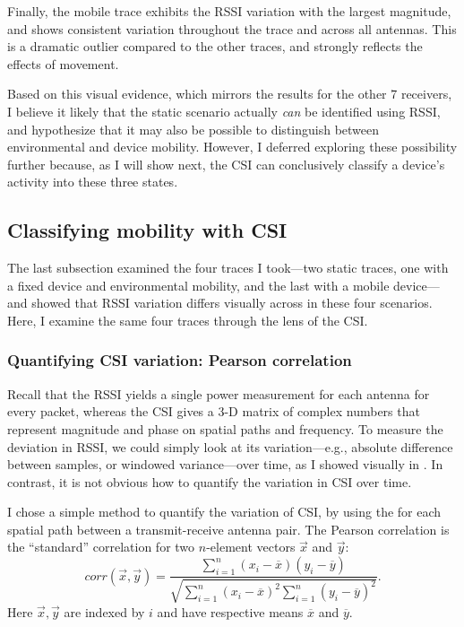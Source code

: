 Finally, the mobile trace exhibits the RSSI variation with the largest magnitude, and shows consistent variation throughout the trace and across all antennas. This is a dramatic outlier compared to the other traces, and strongly reflects the effects of movement.

Based on this visual evidence, which mirrors the results for the other 7 receivers, I believe it likely that the static scenario actually \emph{can} be identified using RSSI, and hypothesize that it may also be possible to distinguish between environmental and device mobility. However, I deferred exploring these possibility further because, as I will show next, the CSI can conclusively classify a device's activity into these three states.

\subsection{Classifying mobility with CSI}
The last subsection examined the four traces I took---two static traces, one with a fixed device and environmental mobility, and the last with a mobile device---and showed that RSSI variation differs visually across in these four scenarios. Here, I examine the same four traces through the lens of the CSI.

\subsubsection{Quantifying CSI variation: Pearson correlation}
Recall that the RSSI yields a single power measurement for each antenna for every packet, whereas the CSI gives a 3-D matrix of complex numbers that represent magnitude and phase on spatial paths and frequency. To measure the deviation in RSSI, we could simply look at its variation---e.g., absolute difference between samples, or windowed variance---over time, as I showed visually in . In contrast, it is not obvious how to quantify the variation in CSI over time.

I chose a simple method to quantify the variation of CSI, by using the  for each spatial path between a transmit-receive antenna pair. The Pearson correlation is the ``standard'' correlation for two $n$-element vectors $\vec{x}$ and $\vec{y}$:
\begin{equation}
\textit{corr}(\vec{x},\vec{y}) = \frac{\sum_{i=1}^n(x_i-\overline{x})(y_i-\overline{y})}{\sqrt{\sum_{i=1}^n(x_i-\overline{x})^2 \sum_{i=1}^n(y_i-\overline{y})^2}}.
\end{equation}
Here $\vec{x},\vec{y}$ are indexed by $i$ and have respective means $\overline{x}$ and $\overline{y}$.

